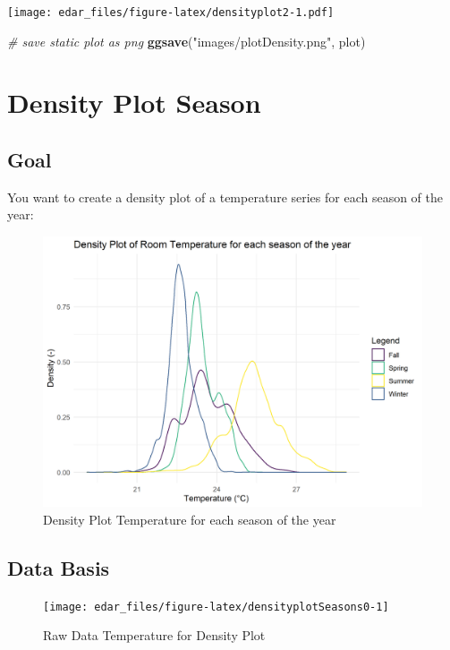 \documentclass[
  a4paperpaper,
]{book}
\newenvironment{Shaded}{\begin{snugshade}}{\end{snugshade}}
\newcommand{\CommentTok}[1]{\textcolor[rgb]{0.56,0.35,0.01}{\textit{#1}}}
\newcommand{\KeywordTok}[1]{\textcolor[rgb]{0.13,0.29,0.53}{\textbf{#1}}}
\newcommand{\NormalTok}[1]{#1}
\newcommand{\StringTok}[1]{\textcolor[rgb]{0.31,0.60,0.02}{#1}}
\let\oldShaded\Shaded
\let\endoldShaded\endShaded
\renewenvironment{Shaded}{\footnotesize\oldShaded}{\endoldShaded}
\begin{document}
\texttt{[image: edar\_files/figure-latex/densityplot2-1.pdf]}

\begin{Shaded}
\begin{Highlighting}[]
\CommentTok{# save static plot as png}
\KeywordTok{ggsave}\NormalTok{(}\StringTok{"images/plotDensity.png"}\NormalTok{, plot)}
\end{Highlighting}
\end{Shaded}

\newpage

\hypertarget{density-plot-season}{%
\section{Density Plot Season}\label{density-plot-season}}

\hypertarget{goal-3}{%
\subsection{Goal}\label{goal-3}}

You want to create a density plot of a temperature series for each season of the year:

\begin{figure}
\includegraphics[width=0.7\linewidth]{images/plotDensitySeasons} \caption{Density Plot Temperature for each season of the year}\label{fig:unnamed-chunk-12}
\end{figure}

\hypertarget{data-basis-3}{%
\subsection{Data Basis}\label{data-basis-3}}

\begin{figure}
\texttt{[image: edar\_files/figure-latex/densityplotSeasons0-1]} \caption{Raw Data Temperature for Density Plot}\label{fig:densityplotSeasons0}
\end{figure}
\newpage
\end{document}

